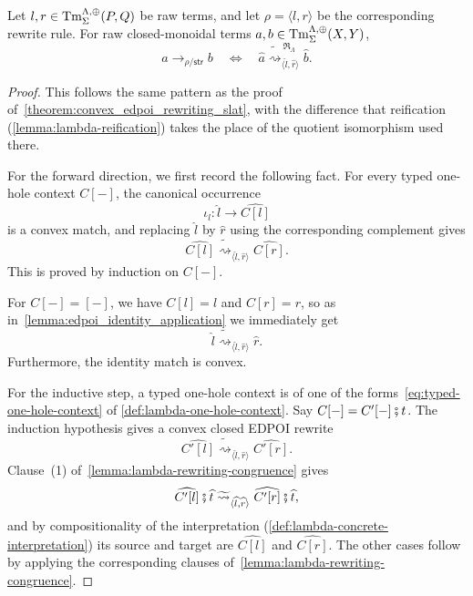 \begin{theorem}
\label{theorem:lambda-rewriting-correspondence}
Let $l, r \in \operatorname{Tm}^{\Lambda,\operatorname{\oplus}}_{\Sigma}(P,Q)$ be raw
terms, and let $\rho = \langle l, r \rangle$ be the corresponding
rewrite rule. For raw closed-monoidal terms
$a, b \in \operatorname{Tm}^{\Lambda,\operatorname{\oplus}}_{\Sigma}(X,Y)$,
\[
 a \longrightarrow_{\rho/\mathsf{str}} b
 \quad\Longleftrightarrow\quad
 \widehat a
 \mathrel{\widetilde{\rightsquigarrow}^{\,\mathfrak R_{\Lambda}}_{\langle\widehat l,\widehat r\rangle}}
 \widehat b.
\]
\end{theorem}
\begin{proof}
This follows the same pattern as the proof
of~\cref{theorem:convex_edpoi_rewriting_slat}, with the difference that
reification (\cref{lemma:lambda-reification}) takes the place of the
quotient isomorphism used there.

For the forward direction, we first record the following fact.
For every typed one-hole context \(C[-]\), the canonical occurrence
\[
  \iota_l:
  \widehat l\longrightarrow\widehat{C[l]}
\]
is a convex match, and replacing \(\widehat l\) by \(\widehat r\) using
the corresponding complement gives
\[
  \widehat{C[l]}
  \mathrel{\widetilde{\rightsquigarrow}_{\langle\widehat l,\widehat r\rangle}}
  \widehat{C[r]}.
  \tag{\(\ast\)}
  \label{eq:lambda-context-replacement-in-proof}
\]
This is proved by induction on \(C[-]\).

For \(C[-]=[-]\), we have \(C[l]=l\) and \(C[r]=r\), so as
in~\cref{lemma:edpoi_identity_application} we immediately get
\[
  \widehat l
  \mathrel{\widetilde{\rightsquigarrow}_{\langle\widehat l,\widehat r\rangle}}
  \widehat r .
\]
Furthermore, the identity match is convex.

For the inductive step, a typed one-hole context is of one of the
forms~\eqref{eq:typed-one-hole-context} of \cref{def:lambda-one-hole-context}. Say
\(C[-]=C'[-]\fatsemi t\). The induction hypothesis gives a convex closed
EDPOI rewrite
\[
  \widehat{C'[l]}
  \mathrel{\widetilde{\rightsquigarrow}_{\langle\widehat l,\widehat r\rangle}}
  \widehat{C'[r]}.
\]
Clause~(1) of~\cref{lemma:lambda-rewriting-congruence} gives
\[
  \widehat{C'[l]}\fatsemi\widehat t
  \mathrel{\widetilde{\rightsquigarrow}_{\langle\widehat l,\widehat r\rangle}}
  \widehat{C'[r]}\fatsemi\widehat t,
\]
and by compositionality of the interpretation
(\cref{def:lambda-concrete-interpretation}) its source and target are
\(\widehat{C[l]}\) and \(\widehat{C[r]}\). The other cases follow by
applying the corresponding clauses
of~\cref{lemma:lambda-rewriting-congruence}.


\end{proof}
